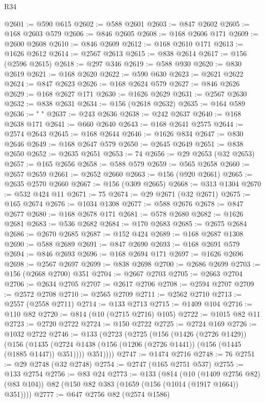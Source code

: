 \begin{lexlean}{R34}
\begin{coremodule}
@2601 := @590 @615
@2602 := @588 @2601
@2603 := @847 @2602
@2605 := @168 @2603 @579
@2606 := @846 @2605
@2608 := @168 @2606 @171
@2609 := @2600 @2608
@2610 := @846 @2609
@2612 := @168 @2610 @171
@2613 := @1626 @2612
@2614 := @2567 @2613
@2615 := @838 @2614
@2617 := @156 (@2596 @2615)
@2618 := @297 @346
@2619 := @588 @930
@2620 := @830 @2619
@2621 := @168 @2620
@2622 := @590 @630
@2623 := @2621 @2622
@2624 := @847 @2623
@2626 := @168 @2624 @579
@2627 := @846 @2626
@2629 := @168 @2627 @171
@2630 := @1626 @2629
@2631 := @2567 @2630
@2632 := @838 @2631
@2634 := @156 (@2618 @2632)
@2635 := @164 @589
@2636 := " "
@2637 := @243 @2636
@2638 := @242 @2637
@2640 := @168 @2638 @171
@2641 := @660 @2640
@2643 := @168 @2641 @2575
@2644 := @2574 @2643
@2645 := @168 @2644
@2646 := @1626 @834
@2647 := @830 @2646
@2649 := @168 @2647 @579
@2650 := @2645 @2649
@2651 := @838 @2650
@2652 := @2635 @2651
@2653 := 74
@2656 := @29 @2653 (@32 @2653)
@2657 := @165 @2656
@2658 := @588 @579
@2659 := @565 @2658
@2660 := @2657 @2659
@2661 := @2652 @2660
@2663 := @156 (@920 @2661)
@2665 := @2635 @2570 @2660
@2667 := @156 (@309 @2665)
@2668 := @313 @1304
@2670 := @532 @424 @11
@2671 := 75
@2674 := @29 @2671 (@32 @2671)
@2675 := @165 @2674
@2676 := @1034 @1308
@2677 := @588 @2676
@2678 := @847 @2677
@2680 := @168 @2678 @171
@2681 := @578 @2680
@2682 := @1626 @2681
@2683 := @536 @2682
@2684 := @170 @2683
@2685 := @2675 @2684
@2686 := @2670 @2685
@2687 := @152 @424
@2689 := @168 @2687 @1308
@2690 := @588 @2689
@2691 := @847 @2690
@2693 := @168 @2691 @579
@2694 := @846 @2693
@2696 := @168 @2694 @171
@2697 := @1626 @2696
@2698 := @2567 @2697
@2699 := @838 @2698
@2700 := @2686 @2699
@2703 := @156 (@2668 @2700) @351
@2704 := @2667 @2703
@2705 := @2663 @2704
@2706 := @2634 @2705
@2707 := @2617 @2706
@2708 := @2594 @2707
@2709 := @2572 @2708
@2710 := @2565 @2709
@2711 := @2562 @2710
@2713 := @2557 (@2558 @2711)
@2714 := @133 @2713
@2715 := @1409 @104
@2716 := @110 @82
@2720 := @814 (@10 (@2715 @2716) @105)
@2722 := @1015 @82 @11
@2723 := @2720 @2722
@2724 := @150 @2722
@2725 := @2724 @169
@2726 := @1032 @2722
@2746 := @133
    (@2723
      (@2725
        (@156
          (@1426 (@2726 @1429))
          (@156
            (@1435 (@2724 @1438 (@156 (@1206 (@2726 @1441)) (@156 (@1445 (@1885 @1447)) @351))))
            @351))))
@2747 := @1474 @2716
@2748 := 76
@2751 := @29 @2748 (@32 @2748)
@2754 := @2747 (@165 @2751 @537)
@2755 := @133 @2754
@2756 := @83 @24
@2773 := @133
    (@814
      (@10 (@1409 @2756 @82) (@83 @104))
      @82
      (@150 @82 @383 (@1659 (@156 (@1014 (@1917 @1664)) @351))))
@2777 := @647 @2756 @82 (@2574 @1586)

\end{coremodule}
\end{lexlean}
